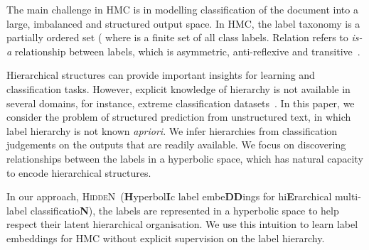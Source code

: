 \documentclass[11pt,a4paper]{article}
\newcommand{\model}{\mbox{\textsc{HiddeN}}}
\begin{document}
The main challenge in HMC is in modelling classification of the document into a large, imbalanced and structured output space. In HMC, the label taxonomy is a partially ordered set ( where  is a finite set of all class labels. Relation  refers to \textit{is-a} relationship between labels, which is asymmetric, anti-reflexive and transitive~\citep{survey}.

Hierarchical structures can provide important insights for learning and classification tasks. However, explicit knowledge of hierarchy is not available in several domains, for instance, extreme classification datasets~\cite{extreme}. In this paper, we consider the problem of structured prediction from unstructured text, in which label hierarchy is not known \textit{apriori}. We infer hierarchies from classification judgements on the outputs that are readily available. We focus on discovering relationships between the labels in a hyperbolic space, which has natural capacity to encode hierarchical structures.

In our approach, \model\ (\textbf{H}yperbol\textbf{I}c label embe\textbf{DD}ings for hi\textbf{E}rarchical multi-label classificatio\textbf{N}), the labels are represented in a hyperbolic space to help respect their latent hierarchical organisation. We use this intuition to learn label embeddings for HMC without explicit supervision on the label hierarchy.
\end{document}
